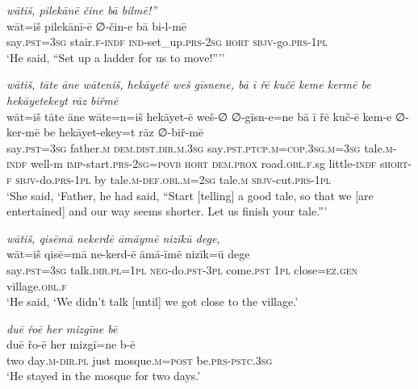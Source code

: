 \ea \label{ŽH.25}
\textit{wātiš, pilekānē čine bā bilmē!”} \\ 
\gll wāt=iš pilekānī-ē ∅-čin-e bā bi-l-mē \\ 
 say\textsc{.pst}\textsc{=3sg} stair\textsc{\textsc{.f}}\textsc{-indf} \textsc{ind-}set\_up\textsc{.prs}-\textsc{2sg} \textsc{hort} \textsc{sbjv-}go\textsc{.prs}\textsc{-1pl} \\ 
\glt `He said, “Set up a ladder for us to move!”’'
\z 
 
\ea \label{ŽH.27}
\textit{wātiš, tāte āne wāteniš, hekāyetē weš gīsnene, bā ī řē kučē keme kermē be hekāyetekeyt rāz biřmē} \\ 
\gll wāt=iš tāte āne wāte=n=iš hekāyet-ē weš-∅ ∅-gīsn-e=ne bā ī řē kuč-ē kem-e ∅-ker-mē be hekāyet-ekey=t rāz ∅-biř-mē \\ 
 say\textsc{.pst}\textsc{=3sg} father\textsc{.m} \textsc{dem.dist}\textsc{.dir}\textsc{.m}\textsc{.3sg} say\textsc{.pst}\textsc{.ptcp}\textsc{.m}\textsc{=cop}\textsc{.3sg}\textsc{.m}\textsc{=3sg} tale\textsc{.m}\textsc{-indf} well-m \textsc{imp-}start\textsc{.prs}-\textsc{2sg}\textsc{=\textsc{povb}} \textsc{hort} \textsc{dem.prox} road\textsc{.obl}\textsc{\textsc{.f}}.sg little\textsc{-indf} s\textsc{hort}\textsc{-f} \textsc{sbjv-}do\textsc{.prs}\textsc{-1pl} by tale\textsc{.m}\textsc{-def}\textsc{.obl}\textsc{.m}\textsc{=\textsc{2sg}} tale\textsc{.m} \textsc{sbjv-}cut\textsc{.prs}\textsc{-1pl} \\ 
\glt `She said, ‘Father, he had said, “Start [telling] a good tale, so that we [are entertained] and our way seems shorter. Let us finish your tale.”'
\z 
 
\ea \label{ŽH.30}
\textit{wātiš, qisēmā nekerdē āmāymē nizīkū dege,} \\ 
\gll wāt=iš qisē=mā ne-kerd-ē āmā-īmē nizīk=ū dege \\ 
 say\textsc{.pst}\textsc{=3sg} talk\textsc{.dir}\textsc{.pl}\textsc{=1pl} \textsc{neg-}do\textsc{.pst}\textsc{-3pl} come\textsc{.pst} \textsc{1pl} close\textsc{=ez}\textsc{.gen} village\textsc{.obl}\textsc{\textsc{.f}} \\ 
\glt `He said, ‘We didn’t talk [until] we got close to the village.'
\z 
 
\ea \label{ŽH.36}
\textit{duē řoē her mizgīne bē} \\ 
\gll duē řo-ē her mizgī=ne b-ē \\ 
 two day\textsc{.m}\textsc{-dir}\textsc{.pl} just mosque\textsc{.m}\textsc{=\textsc{post}} be\textsc{.prs}\textsc{-pstc}\textsc{.3sg} \\ 
\glt `He stayed in the mosque for two days.'
\z 
 
